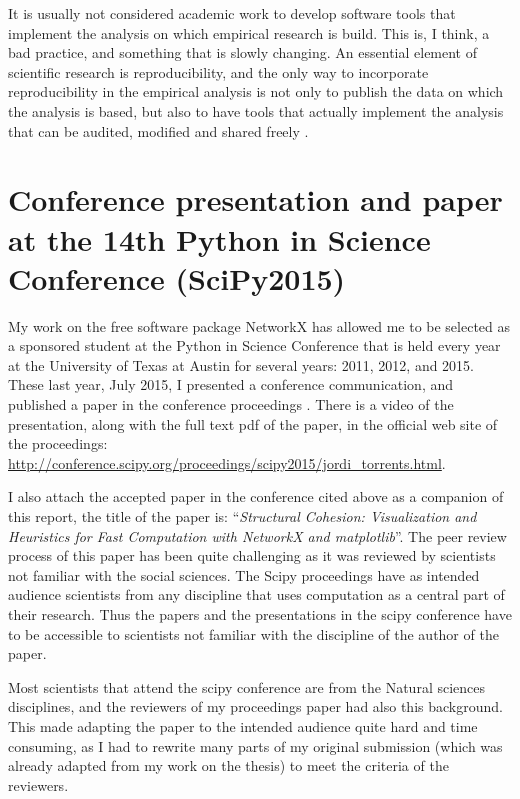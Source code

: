 It is usually not considered academic work to develop software tools that implement the analysis on which empirical research is build. This is, I think, a bad practice, and something that is slowly changing. An essential element of scientific research is reproducibility, and the only way to incorporate reproducibility in the empirical analysis is not only to publish the data on which the analysis is based, but also to have tools that actually implement the analysis that can be audited, modified and shared freely \citep{ince:2012}.

\section{Conference presentation and paper at the 14th Python in Science Conference (SciPy2015)}

My work on the free software package NetworkX has allowed me to be selected as a sponsored student at the Python in Science Conference that is held every year at the University of Texas at Austin for several years: 2011, 2012, and 2015. These last year, July 2015, I presented a conference communication, and published a paper in the conference proceedings \citep{torrents:2015b}. There is a video of the presentation, along with the full text pdf of the paper, in the official web site of the proceedings: \href{http://conference.scipy.org/proceedings/scipy2015/jordi_torrents.html}{http://conference.scipy.org/proceedings/scipy2015/jordi\_torrents.html}.

I also attach the accepted paper in the conference cited above as a companion of this report, the title of the paper is: ``\textit{Structural Cohesion: Visualization and Heuristics for Fast Computation with NetworkX and matplotlib}''. The peer review process of this paper has been quite challenging as it was reviewed by scientists not familiar with the social sciences. The Scipy proceedings have as intended audience scientists from any discipline that uses computation as a central part of their research. Thus the papers and the presentations in the scipy conference have to be accessible to scientists not familiar with the discipline of the author of the paper.

Most scientists that attend the scipy conference are from the Natural sciences disciplines, and the reviewers of my proceedings paper had also this background. This made adapting the paper to the intended audience quite hard and time consuming, as I had to rewrite many parts of my original submission (which was already adapted from my work on the thesis) to meet the criteria of the reviewers.

